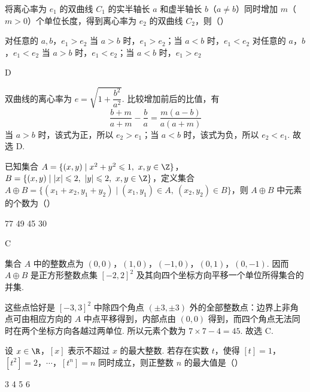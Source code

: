 \begin{problem}
将离心率为 \(e_1\) 的双曲线 \(C_1\) 的实半轴长 \(a\) 和虚半轴长 \(b\)（\(a\neq b\)）同时增加 \(m\)（\(m>0\)）个单位长度，得到离心率为 \(e_2\) 的双曲线 \(C_2\)，则（\quad）

\choices
    {对任意的 \(a,b\)，\(e_1>e_2\)}
    {当 \(a>b\) 时，\(e_1>e_2\)；当 \(a<b\) 时，\(e_1<e_2\)}
    {对任意的 \(a\)，\(b\)，\(e_1<e_2\)}
    {当 \(a>b\) 时，\(e_1<e_2\)；当 \(a<b\) 时，\(e_1>e_2\)}
\end{problem}

\begin{answer}
D
\end{answer}

\begin{solution}
双曲线的离心率为 \(e=\sqrt{1+\dfrac{b^2}{a^2}}\). 比较增加前后的比值，有
\[
\frac{b+m}{a+m}-\frac ba=\frac{m(a-b)}{a(a+m)}
\]
当 \(a>b\) 时，该式为正，所以 \(e_2>e_1\)；当 \(a<b\) 时，该式为负，所以 \(e_2<e_1\). 故选 D.
\end{solution}

\begin{problem}
已知集合 \(A=\{(x,y)\mid x^2+y^2\leqslant1,\ x,y\in\Z\}\)，\(B=\{(x,y)\mid |x|\leqslant2,\ |y|\leqslant2,\ x,y\in\Z\}\)，定义集合 \(A\oplus B=\{(x_1+x_2,y_1+y_2)\mid (x_1,y_1)\in A,\ (x_2,y_2)\in B\}\)，则 \(A\oplus B\) 中元素的个数为（\quad）

\choices
    {77}
    {49}
    {45}
    {30}
\end{problem}

\begin{answer}
C
\end{answer}

\begin{solution}
集合 \(A\) 中的整数点为 \((0,0)\)，\((1,0)\)，\((-1,0)\)，\((0,1)\)，\((0,-1)\). 因而 \(A\oplus B\) 是正方形整数点集 \([-2,2]^2\) 及其向四个坐标方向平移一个单位所得集合的并集.

这些点恰好是 \([-3,3]^2\) 中除四个角点 \((\pm3,\pm3)\) 外的全部整数点：边界上非角点可由相应方向的 \(A\) 中点平移得到，内部点由 \((0,0)\) 得到，而四个角点无法同时在两个坐标方向各越过两单位. 所以元素个数为 \(7\times7-4=45\). 故选 C.
\end{solution}

\begin{problem}
设 \(x\in\R\)，\([x]\) 表示不超过 \(x\) 的最大整数. 若存在实数 \(t\)，使得 \([t]=1\)，\([t^2]=2\)，\(\cdots\)，\([t^n]=n\) 同时成立，则正整数 \(n\) 的最大值是（\quad）

\choices
    {3}
    {4}
    {5}
    {6}
\end{problem}

